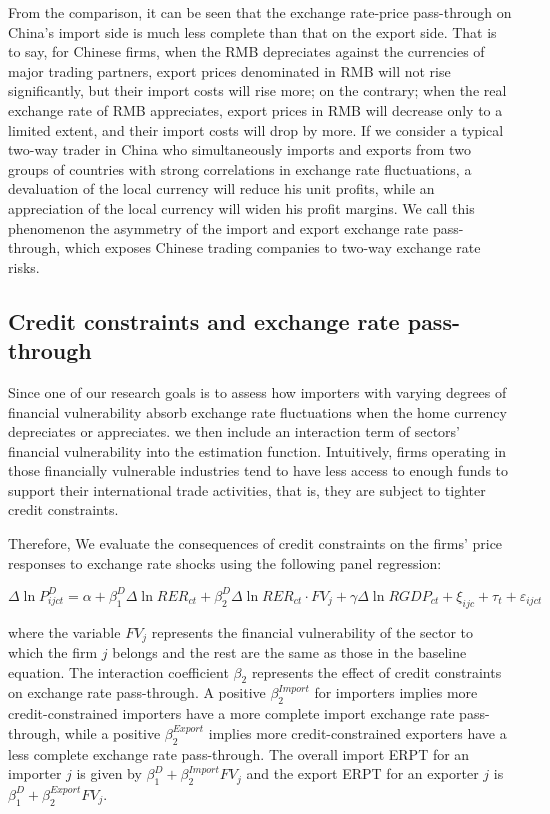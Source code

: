 \documentclass[12pt]{article}
\begin{document}
From the comparison, it can be seen that the exchange rate-price pass-through on China's import side is much less complete than that on the export side. That is to say, for Chinese firms, when the RMB depreciates against the currencies of major trading partners, export prices denominated in RMB will not rise significantly, but their import costs will rise more; on the contrary; when the real exchange rate of RMB appreciates, export prices in RMB will decrease only to a limited extent, and their import costs will drop by more. If we consider a typical two-way trader in China who simultaneously imports and exports from two groups of countries with strong correlations in exchange rate fluctuations, a devaluation of the local currency will reduce his unit profits, while an appreciation of the local currency will widen his profit margins. We call this phenomenon the asymmetry of the import and export exchange rate pass-through, which exposes Chinese trading companies to two-way exchange rate risks.

\subsection{Credit constraints and exchange rate pass-through}

Since one of our research goals is to assess how importers with varying degrees of financial vulnerability absorb exchange rate fluctuations when the home currency depreciates or appreciates. we then include an interaction term of sectors’ financial vulnerability into the estimation function. Intuitively, firms operating in those financially vulnerable industries tend to have less access to enough funds to support their international trade activities, that is, they are subject to tighter credit constraints.

Therefore, We evaluate the consequences of credit constraints on the firms' price responses to exchange rate shocks using the following panel regression:

\begin{equation}
	\Delta \ln P^{D}_{ijct}=\alpha+\beta^D_{1} \Delta \ln RER_{ct}+\beta^D_{2} \Delta \ln RER_{ct} \cdot FV_{j}+\gamma \Delta \ln RGDP_{ct}+\xi_{ijc}+\tau_{t} +\varepsilon_{ijct}
	\label{eq.credit}
\end{equation}

where the variable $FV_{j}$ represents the financial vulnerability of the sector to which the firm $j$ belongs and the rest are the same as those in the baseline equation. The interaction coefficient $\beta_2$ represents the effect of credit constraints on exchange rate pass-through. A positive $\beta^{Import}_2$ for importers implies more credit-constrained importers have a more complete import exchange rate pass-through, while a positive $\beta^{Export}_2$ implies more credit-constrained exporters have a less complete exchange rate pass-through. The overall import ERPT for an importer $j$ is given by $\beta^D_{1} +\beta^{Import}_{2} FV_j$ and the export ERPT for an exporter $j$ is  $\beta^D_{1} +\beta^{Export}_{2} FV_j$.
\end{document}
